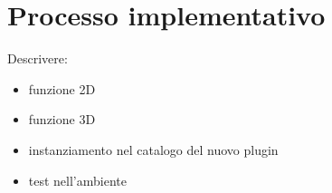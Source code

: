 \section{Processo implementativo}
\label{sec:chapter_3_section_6}

Descrivere:

\begin{itemize}
  \item funzione 2D
  \item funzione 3D
  \item instanziamento nel catalogo del nuovo plugin
  \item test nell'ambiente
\end{itemize}
